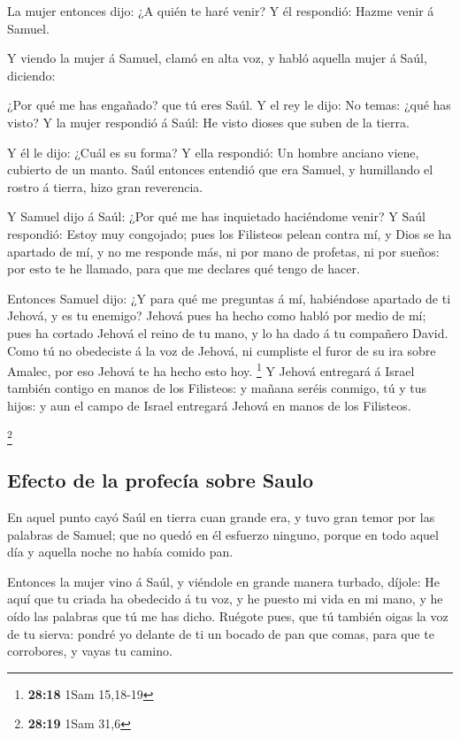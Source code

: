  La mujer entonces dijo: ¿A quién te haré venir? Y él
respondió: Hazme venir á Samuel.

 Y viendo la mujer á Samuel, clamó en alta voz, y habló
aquella mujer á Saúl, diciendo:

 ¿Por qué me has engañado? que tú eres Saúl. Y el rey le
dijo: No temas: ¿qué has visto? Y la mujer respondió á Saúl: He visto
dioses que suben de la tierra.

 Y él le dijo: ¿Cuál es su forma? Y ella respondió: Un
hombre anciano viene, cubierto de un manto. Saúl entonces entendió que
era Samuel, y humillando el rostro á tierra, hizo gran reverencia.

 Y Samuel dijo á Saúl: ¿Por qué me has inquietado
haciéndome venir? Y Saúl respondió: Estoy muy congojado; pues los
Filisteos pelean contra mí, y Dios se ha apartado de mí, y no me
responde más, ni por mano de profetas, ni por sueños: por esto te he
llamado, para que me declares qué tengo de hacer.

 Entonces Samuel dijo: ¿Y para qué me preguntas á mí,
habiéndose apartado de ti Jehová, y es tu enemigo? 
Jehová pues ha hecho como habló por medio de mí; pues ha cortado Jehová
el reino de tu mano, y lo ha dado á tu compañero David. 
Como tú no obedeciste á la voz de Jehová, ni cumpliste el furor de su
ira sobre Amalec, por eso Jehová te ha hecho esto hoy. \footnote{\textbf{28:18}
  1Sam 15,18-19}  Y Jehová entregará á Israel también
contigo en manos de los Filisteos: y mañana seréis conmigo, tú y tus
hijos: y aun el campo de Israel entregará Jehová en manos de los
Filisteos.

\footnote{\textbf{28:19} 1Sam 31,6}

\hypertarget{efecto-de-la-profecuxeda-sobre-saulo}{%
\subsection{Efecto de la profecía sobre
Saulo}\label{efecto-de-la-profecuxeda-sobre-saulo}}

 En aquel punto cayó Saúl en tierra cuan grande era, y
tuvo gran temor por las palabras de Samuel; que no quedó en él esfuerzo
ninguno, porque en todo aquel día y aquella noche no había comido pan.

 Entonces la mujer vino á Saúl, y viéndole en grande
manera turbado, díjole: He aquí que tu criada ha obedecido á tu voz, y
he puesto mi vida en mi mano, y he oído las palabras que tú me has
dicho.  Ruégote pues, que tú también oigas la voz de tu
sierva: pondré yo delante de ti un bocado de pan que comas, para que te
corrobores, y vayas tu camino.

